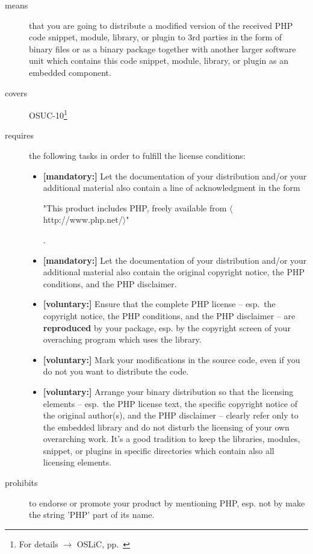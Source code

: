 \begin{description}
\item[means] that you are going to distribute a modified version of the received
PHP code snippet, module, library, or plugin to 3rd parties in the form of
binary files or as a binary package together with another larger software unit
which contains this code snippet, module, library, or plugin as an embedded
component.
\item[covers] OSUC-10\footnote{For details $\rightarrow$ OSLiC, pp.\ \pageref{OSUC-10-DEF}}
\item[requires] the following tasks in order to fulfill the license conditions:
\begin{itemize}

  \item \textbf{[mandatory:]} Let the documentation of your distribution and/or
  your additional material also contain a line of acknowledgment in the form
  \begin{footnotesize}"This product includes PHP, freely available from
  $\langle$http://www.php.net/$\rangle$"\end{footnotesize}.
    
  \item \textbf{[mandatory:]} Let the documentation of your distribution and/or
  your additional material also contain the original copyright notice, the PHP
  conditions, and the PHP disclaimer.

  \item \textbf{[voluntary:]} Ensure that the complete PHP license -- esp.\ the
  copyright notice, the PHP conditions, and the PHP disclaimer -- are
  \textbf{reproduced} by your package, esp. by the copyright screen of your
  overaching program which uses the library.
    
  \item \textbf{[voluntary:]} Mark your modifications in the source code,
  even if you do not you want to distribute the code.
  
  \item \textbf{[voluntary:]} Arrange your binary distribution so that the
  licensing elements -- esp.\ the PHP license text, the specific copyright
  notice of the original author(s), and the PHP disclaimer -- clearly refer
  only to the embedded library and do not disturb the licensing of your own
  overarching work. It's a good tradition to keep the libraries, modules,
  snippet, or plugins in specific directories which contain also all licensing
  elements.
\end{itemize}

\item[prohibits] to endorse or promote your product by mentioning PHP, esp. not
by make the string 'PHP' part of its name.

\end{description}

